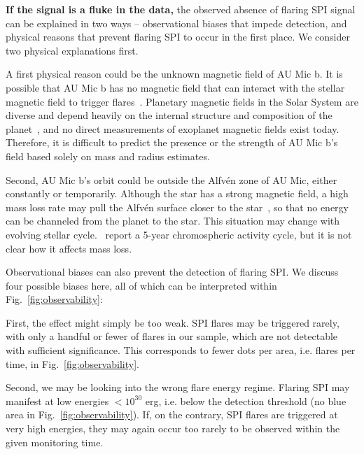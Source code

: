 \documentclass[fleqn,usenatbib]{mnras}%
\begin{document}
\textbf{If the signal is a fluke in the data, }the observed absence of flaring SPI signal can be explained in two ways -- observational biases that impede detection, and physical reasons that prevent flaring SPI to occur in the first place. We consider two physical explanations first.

A first physical reason could be the unknown magnetic field of AU Mic b. It is possible that AU Mic b has no magnetic field that can interact with the stellar magnetic field to trigger flares~\citep{lanza2018close-by}. Planetary magnetic fields in the Solar System are diverse and depend heavily on the internal structure and composition of the planet~\citep{stevenson2003planetary}, and no direct measurements of exoplanet magnetic fields exist today. Therefore, it is difficult to predict the presence or the strength of AU Mic b's field based solely on mass and radius estimates.

Second, AU Mic b's orbit could be outside the Alfv\'en zone of AU Mic, either constantly or temporarily. Although the star has a strong magnetic field, a high mass loss rate may pull the Alfv\'en surface closer to the star~\citep{kavanagh2021}, so that no energy can be channeled from the planet to the star. This situation may change with evolving stellar cycle.~\citet{ibanezbustos2019first} report a 5-year chromospheric activity cycle, but it is not clear how it affects mass loss.

Observational biases can also prevent the detection of flaring SPI. We discuss four possible biases here, all of which can be interpreted within Fig.~\ref{fig:observability}:

First, the effect might simply be too weak. SPI flares may be triggered rarely, with only a handful or fewer of flares in our sample, which are not detectable with sufficient significance. This corresponds to fewer dots per area, i.e. flares per time, in Fig.~\ref{fig:observability}.

Second, we may be looking into the wrong flare energy regime. Flaring SPI may manifest at low energies $<10^{30}$ erg, i.e. below the detection threshold (no blue area in Fig.~\ref{fig:observability}). If, on the contrary, SPI flares are triggered at very high energies, they may again occur too rarely to be observed within the given monitoring time. 
\end{document}
